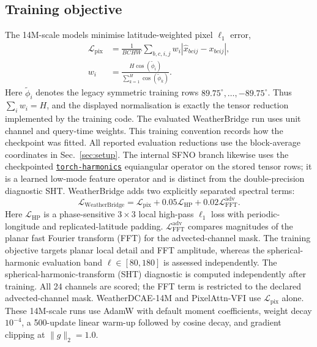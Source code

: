 \documentclass[referee,lineno,pdflatex,sn-nature]{sn-jnl}
\begin{document}
\begin{deferredmethodsrest}


\subsection{Training objective}
\label{sec:training_objective}

The 14M-scale models minimise latitude-weighted pixel $\ell_1$ error,
\[
\begin{aligned}
\mathcal{L}_{\mathrm{pix}}
&= \frac{1}{BCHW}\sum_{b,c,i,j}
w_i\left|\hat{x}_{bcij}-x_{bcij}\right|,\\
w_i &=\frac{H\cos(\widetilde\phi_i)}
{\sum_{k=1}^{H}\cos(\widetilde\phi_k)}.
\end{aligned}
\]
Here $\widetilde\phi_i$ denotes the legacy symmetric training rows
$89.75^\circ,\ldots,-89.75^\circ$. Thus $\sum_i w_i=H$, and the displayed
normalisation is exactly the tensor reduction implemented by the training
code. The evaluated WeatherBridge run uses unit channel and
query-time weights. This training convention records how the checkpoint was
fitted. All reported evaluation reductions use the block-average coordinates
in Sec.~\ref{sec:setup}. The internal SFNO
branch likewise uses the checkpointed
\href{https://github.com/NVIDIA/torch-harmonics}{\texttt{torch-harmonics}}
equiangular operator \cite{bonev2023sfno} on the stored tensor rows; it is a learned low-mode
feature operator and is distinct from the double-precision diagnostic SHT.
WeatherBridge adds two explicitly separated spectral terms:
\[
\mathcal L_{\mathrm{WeatherBridge}}
 =\mathcal L_{\mathrm{pix}}+0.05\mathcal L_{\mathrm{HP}}
   +0.02\mathcal L_{\mathrm{FFT}}^{\mathrm{adv}}.
\]
Here $\mathcal L_{\mathrm{HP}}$ is a phase-sensitive $3\times3$ local
high-pass $\ell_1$ loss with periodic-longitude and replicated-latitude
padding. $\mathcal L_{\mathrm{FFT}}^{\mathrm{adv}}$
compares magnitudes of the planar fast Fourier transform (FFT) for the
advected-channel mask. The training objective targets planar local detail and
FFT amplitude, whereas the spherical-harmonic evaluation band
$\ell\in[80,180]$ is assessed independently. The
spherical-harmonic-transform (SHT) diagnostic is computed independently after
training. All 24 channels are scored; the FFT term is restricted to the
declared advected-channel mask.
WeatherDCAE-14M and PixelAttn-VFI use $\mathcal L_{\mathrm{pix}}$ alone.
These 14M-scale runs use AdamW \cite{loshchilov2019adamw} with default moment
coefficients, weight decay
$10^{-4}$, a 500-update linear warm-up followed by cosine decay, and
gradient clipping at $\|g\|_2=1.0$.


\end{deferredmethodsrest}
\end{document}
